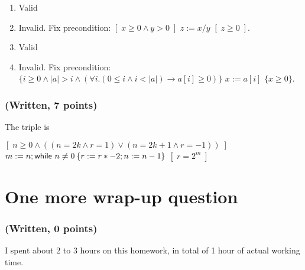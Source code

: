 \documentclass{article}
\newcommand{\trplpc}[3]{$\{#1\}$ $#2$ $\{#3\}$}
\newcommand{\trpltc}[3]{$[\;#1\;]$ $#2$ $[\;#3\;]$}
\begin{document}
\begin{enumerate}
    \item Valid
    \item Invalid. Fix precondition: \trpltc{x \geq 0 \wedge y > 0}{z := x/y}{z \geq 0}.
    \item Valid
    \item Invalid. Fix precondition: \trplpc{i \geq 0 \wedge |a| > i \wedge (\forall i.(0 \leq i \wedge i < |a|) \rightarrow a[i] \geq 0)}{x := a[i]}{x \geq 0}.
\end{enumerate}

\subsubsection{(Written, 7 points)}

The triple is

\begin{center}
    \trpltc{n \geq 0 \wedge ((n = 2k \wedge r = 1) \vee (n = 2k + 1 \wedge r = -1))}{m := n; \text{\sffamily while } n \neq 0 \: \{r := r * -2; n := n - 1\}}{r = 2^m}
\end{center}

\section{One more wrap-up question}

\subsubsection{(Written, 0 points)}

I spent about 2 to 3 hours on this homework, in total of 1 hour of actual working
time.
\end{document}
